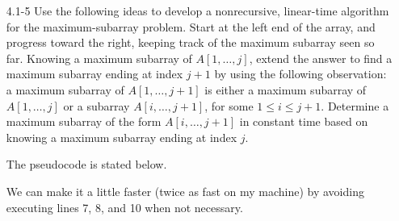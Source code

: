 \documentclass{report}
\makeatletter
\renewenvironment{framed}{%
 \def\FrameCommand##1{\hskip\@totalleftmargin
 \fboxsep=\FrameSep\fbox{##1}}%
 \MakeFramed {\advance\hsize-\width
   \@totalleftmargin\z@ \linewidth\hsize
   \@setminipage}}%
 {\par\unskip\endMakeFramed}
\makeatother
\begin{document}
\begin{enumerate}
\item[4.1{-}5]{Use the following ideas to develop a nonrecursive, linear-time
algorithm for the maximum-subarray problem. Start at the left end of the
array, and progress toward the right, keeping track of the maximum subarray
seen so far. Knowing a maximum subarray of $A[1, \dots, j]$, extend the answer
to find a maximum subarray ending at index $j + 1$ by using the following
observation: a maximum subarray of $A[1, \dots, j + 1]$ is either a maximum
subarray of $A[1, \dots, j]$ or a subarray $A[i, \dots, j + 1]$, for some
$1 \le i \le j + 1$. Determine a maximum subarray of the form $A[i, \dots,
j + 1]$ in constant time based on knowing a maximum subarray ending at index
$j$.}

\begin{framed}
The pseudocode is stated below.\\
\begin{algorithm}[H]
\SetAlgoNoEnd\DontPrintSemicolon
\BlankLine
{}
\end{algorithm}

\vspace{0.5mm}

We can make it a little faster (twice as fast on my machine) by avoiding
executing lines 7, 8, and 10 when not necessary.\\
\begin{algorithm}[H]
\SetAlgoNoEnd\DontPrintSemicolon
\BlankLine
{}
\end{algorithm}
\end{framed}

\end{enumerate}
\end{document}
